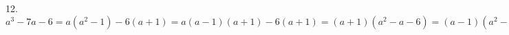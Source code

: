 12. $a^3-7a-6=a(a^2-1)-6(a+1)=a(a-1)(a+1)-6(a+1)=(a+1)(a^2-a-6)=(a-1)(a^2-4-(a+2))=(a+1)((a-2)(a+2)-(a+2))=(a+1)(a+2)(a-3).$\\
